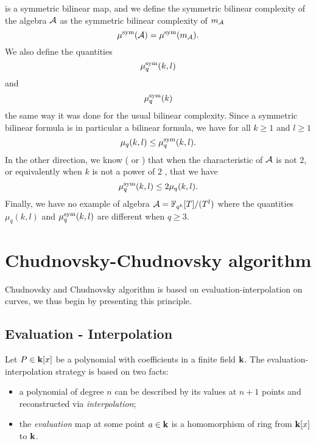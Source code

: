 is a symmetric bilinear map, and we define the symmetric bilinear complexity of
the algebra $\mathcal{A}$ as the symmetric bilinear complexity of $m_{\mathcal{A}}$
\[
  \mu^{\textrm{sym}}(\mathcal{A}) = \mu^{\textrm{sym}}(m_{\mathcal{A}}).
\]
We also define the quantities
\[
  \mu^{\textrm{sym}}_q(k, l)
\]
and 
\[
  \mu^{\textrm{sym}}_q(k)
\]
the same way it was done for the usual bilinear complexity. Since a symmetric
bilinear formula is in particular a bilinear formula, we have for all $k\geq1$
and $l\geq1$
\[
  \mu_q(k, l)\leq\mu^{\textrm{sym}}_q(k, l).
\]
In the other direction, we know (\cite[Theorem $1$]{SL84} or \cite[Lemma
$1.6$]{Randriam12}) that when the characteristic of $\mathcal{A}$ is not $2$,
or equivalently when $k$ is not a power of $2$ , that we have
\[
  \mu^{\textrm{sym}}_q(k, l)\leq2\mu_q(k, l).
\]
Finally, we have no example of algebra $\mathcal{A} = \mathbb{F}_{q^k}[T]/(T^l)$ where the
quantities $\mu_q(k, l)$ and $\mu^{\textrm{sym}}_q(k, l)$ are different when $q\geq3$.

\section{Chudnovsky-Chudnovsky algorithm}
Chudnovsky and Chudnovsky algorithm is based on evaluation-interpolation on
curves, we thus begin by presenting this principle.
\subsection{Evaluation - Interpolation}
\label{sec:evalinter}

Let $P\in\mathbf{k}[x]$ be a polynomial with coefficients in a finite field $\mathbf{k}$. The
evaluation-interpolation strategy is based on two facts:
\begin{itemize}
  \item a polynomial of degree $n$ can be described by its values at $n+1$
    points and reconstructed via \emph{interpolation};
  \item the \emph{evaluation} map at some point $a\in\mathbf{k}$ is a homomorphism of ring from
    $\mathbf{k}[x]$ to $\mathbf{k}$.
\end{itemize}

